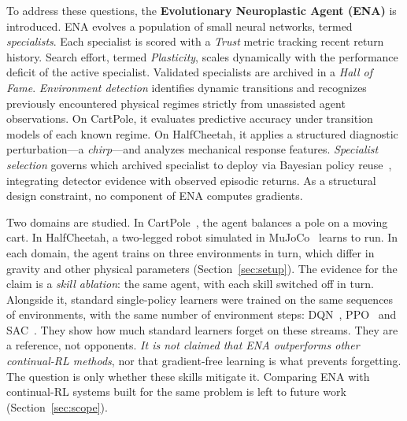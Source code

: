 To address these questions, the \textbf{Evolutionary Neuroplastic Agent (ENA)} is introduced. ENA evolves a population of small neural networks, termed \textit{specialists}. Each specialist is scored with a \textit{Trust} metric tracking recent return history. Search effort, termed \textit{Plasticity}, scales dynamically with the performance deficit of the active specialist. Validated specialists are archived in a \textit{Hall of Fame}. \textit{Environment detection} identifies dynamic transitions and recognizes previously encountered physical regimes strictly from unassisted agent observations. On CartPole, it evaluates predictive accuracy under transition models of each known regime. On HalfCheetah, it applies a structured diagnostic perturbation---a \textit{chirp}---and analyzes mechanical response features. \textit{Specialist selection} governs which archived specialist to deploy via Bayesian policy reuse~\cite{rosman2016bayesian}, integrating detector evidence with observed episodic returns. As a structural design constraint, no component of ENA computes gradients.

Two domains are studied. In CartPole~\cite{barto1983neuronlike}, the agent balances a pole on a moving cart. In HalfCheetah, a two-legged robot simulated in MuJoCo~\cite{todorov2012mujoco} learns to run. In each domain, the agent trains on three environments in turn, which differ in gravity and other physical parameters (Section~\ref{sec:setup}). The evidence for the claim is a \textit{skill ablation}: the same agent, with each skill switched off in turn. Alongside it, standard single-policy learners were trained on the same sequences of environments, with the same number of environment steps: DQN~\cite{mnih2015human}, PPO~\cite{schulman2017proximal} and SAC~\cite{haarnoja2018soft}. They show how much standard learners forget on these streams. They are a reference, not opponents. \textit{It is not claimed that ENA outperforms other continual-RL methods}, nor that gradient-free learning is what prevents forgetting. The question is only whether these skills mitigate it. Comparing ENA with continual-RL systems built for the same problem is left to future work (Section~\ref{sec:scope}).


